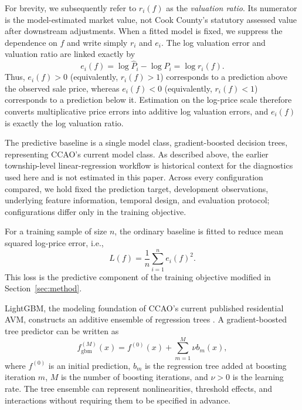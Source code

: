 \documentclass[10pt]{article}
\theoremstyle{definition}
\newcommand{\1}{\mathbf{1}}
\begin{document}
{For brevity, we subsequently refer to $r_i(f)$ as the \emph{valuation ratio}. Its numerator is the model-estimated market value, not Cook County's statutory assessed value after downstream adjustments. When a fitted model is fixed, we suppress the dependence on $f$ and write simply $r_i$ and $e_i$. The log valuation error and valuation ratio are linked exactly by}
\begin{equation}
\label{eq:log_ratio}
e_i(f)
=
\log \widehat{P}_i-\log P_i
=
\log r_i(f).
\end{equation}
Thus, $e_i(f)>0$ (equivalently, $r_i(f)>1$) corresponds to a prediction above the observed sale price, whereas $e_i(f)<0$ (equivalently, $r_i(f)<1$) corresponds to a prediction below it.
{Estimation on the log-price scale therefore converts multiplicative price errors into additive log valuation errors, and $e_i(f)$ is exactly the log valuation ratio.}

The predictive baseline is a single model class, gradient-boosted decision trees, representing CCAO's current model class. As described above, the earlier township-level linear-regression workflow is historical context for the diagnostics used here and is not estimated in this paper. Across every configuration compared, we hold fixed the prediction target, development observations, underlying feature information, temporal design, and evaluation protocol; configurations differ only in the training objective.

For a training sample of size $n$, the ordinary baseline is fitted to reduce mean squared log-price error, i.e.,
\begin{equation}
\label{eq:baseline_learning}
L(f)
=
\frac{1}{n}\sum_{i=1}^n e_i(f)^2.
\end{equation}
This loss is the predictive component of the training objective modified in Section~\ref{sec:method}.


{LightGBM, the modeling foundation of CCAO's current published residential AVM, constructs an additive ensemble of regression trees \cite{CCAOModelResAVM2026,lightgbm}. A gradient-boosted tree predictor can be written as}
\begin{equation}
\label{eq:boosted_tree_model}
f_{\mathrm{gbm}}^{(M)}(x)
=
f^{(0)}(x)
+
\sum_{m=1}^{M}\nu b_m(x),
\end{equation}
where $f^{(0)}$ is an initial prediction, $b_m$ is the regression tree added at boosting iteration $m$, $M$ is the number of boosting iterations, and $\nu>0$ is the learning rate. The tree ensemble can represent nonlinearities, threshold effects, and interactions without requiring them to be specified in advance.
\end{document}
